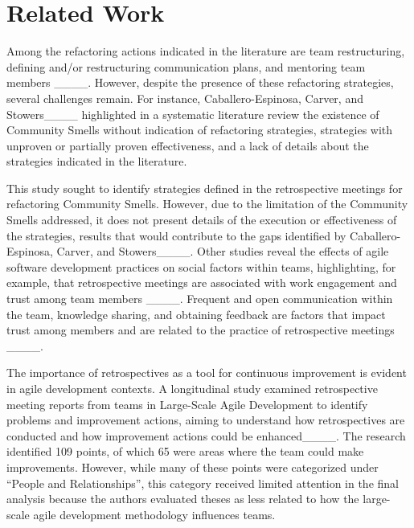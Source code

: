 \section{Related Work}
\label{relatedwork}

Among the refactoring actions indicated in the literature are team restructuring, defining and/or restructuring communication plans, and mentoring team members ____. However, despite the presence of these refactoring strategies, several challenges remain. For instance, Caballero-Espinosa, Carver, and Stowers____ highlighted in a systematic literature review the existence of Community Smells without indication of refactoring strategies, strategies with unproven or partially proven effectiveness, and a lack of details about the strategies indicated in the literature.

This study sought to identify strategies defined in the retrospective meetings for refactoring Community Smells. However, due to the limitation of the Community Smells addressed, it does not present details of the execution or effectiveness of the strategies, results that would contribute to the gaps identified by Caballero-Espinosa, Carver, and Stowers____.
Other studies reveal the effects of agile software development practices on social factors within teams, highlighting, for example, that retrospective meetings are associated with work engagement and trust among team members ____. Frequent and open communication within the team, knowledge sharing, and obtaining feedback are factors that impact trust among members and are related to the practice of retrospective meetings ____.

The importance of retrospectives as a tool for continuous improvement is evident in agile development contexts. A longitudinal study examined retrospective meeting reports from teams in Large-Scale Agile Development to identify problems and improvement actions, aiming to understand how retrospectives are conducted and how improvement actions could be enhanced____. The research identified 109 points, of which 65 were areas where the team could make improvements. However, while many of these points were categorized under ``People and Relationships'', this category received limited attention in the final analysis because the authors evaluated theses as less related to how the large-scale agile development methodology influences teams.

